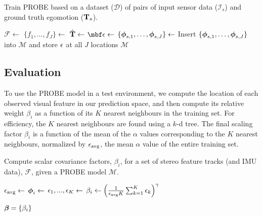 \begin{algorithm}
  \caption{Train PROBE based on a dataset ($\mathcal{D}$) of pairs of input sensor data ($\mathcal{I}_s$) and ground truth egomotion ($\boldsymbol{\mathbf{T}}_s$).}
   \label{alg:probe_train}
  \begin{algorithmic}
	\State $\mathcal{F} \gets$ 
	\State $\{f_1, \dots, f_J\} \gets$ 
	\State $\hat{\boldsymbol{\mathbf{T}}} \gets$ 
	\State $\mbf \PROBEPoseError  \gets$ 
	\State $\{\boldsymbol{\mathbf{\phi}}_{s,1}, \dots, \boldsymbol{\mathbf{\phi}}_{s,J}\} \gets$ 
	\State Insert $\{\boldsymbol{\mathbf{\phi}}_{s,1}, \dots,  \boldsymbol{\mathbf{\phi}}_{s,J}\}$ into $\mathcal{M}$ and store $\epsilon$ at all $J$ locations
	\EndFor
      \EndFor
      \State\Return  $\mathcal{M}$
    \EndFunction
  \end{algorithmic}
\end{algorithm}

	\subsection{Evaluation}
To use the PROBE model in a test environment, we compute the location of each observed visual feature in our prediction space, and then compute its relative weight $\beta_i$ as a function of its $K$ nearest neighbours in the training set.
For efficiency, the $K$ nearest neighbours are found using a $k$-d tree.
The final scaling factor $\beta_i$ is a function of the mean of the $\alpha$ values corresponding to the $K$ nearest neighbours, normalized by $\epsilon_\text{avg}$, the mean $\alpha$ value of the entire training set.

\begin{algorithm}
  \caption{Compute scalar covariance factors, $\beta_i$, for a set of stereo feature tracks (and IMU data), $\mathcal{F}$, given a PROBE model $\mathcal{M}$.}
  \label{alg:probe_test}
  \begin{algorithmic}
     \State $\epsilon_\text{avg} \gets$ 
        \State $\boldsymbol{\mathbf{\phi}}_i \gets$  
        \State $\epsilon_1,...,\epsilon_K \gets$ 
		\State $\beta_i \gets \left(\frac{1}{\epsilon_\text{avg} K} \sum_{k=1}^K \epsilon_k  \right)^{\gamma}$
		
	   \EndFor
      \State\Return $\boldsymbol{\beta} = \{\beta_i\}$
    \EndFunction
  \end{algorithmic}
\end{algorithm}



